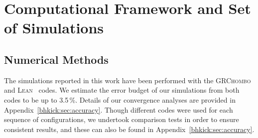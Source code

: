 \section{Computational Framework and Set of Simulations}
\label{bhkick:sec:NR}
%
\subsection{Numerical Methods}

The simulations reported in this work have been performed with the
\textsc{GRChombo}~\cite{Clough:2015sqa, GRChomboWebsite} and
\textsc{Lean}~\cite{Sperhake:2006cy} codes.
We estimate the error budget of our simulations from both codes to be up to 3.5\,\%. Details of our convergence analyses are provided in
Appendix~\ref{bhkick:sec:accuracy}. Though different codes were
used for each sequence of configurations, we undertook comparison tests
in order to ensure consistent results, and these can also be found in
Appendix~\ref{bhkick:sec:accuracy}.

